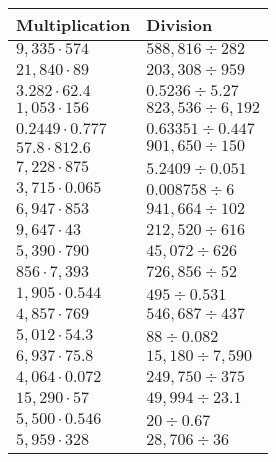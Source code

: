 \begin{longtable}[]{@{}ll@{}}
\toprule
Multiplication & Division\tabularnewline
\midrule
\endhead
\(9,335\cdot574\) & \(588,816÷282\)\tabularnewline
\(21,840\cdot89\) & \(203,308÷959\)\tabularnewline
\(3.282\cdot62.4\) & \(0.5236÷5.27\)\tabularnewline
\(1,053\cdot156\) & \(823,536÷6,192\)\tabularnewline
\(0.2449\cdot0.777\) & \(0.63351÷0.447\)\tabularnewline
\(57.8\cdot812.6\) & \(901,650÷150\)\tabularnewline
\(7,228\cdot875\) & \(5.2409÷0.051\)\tabularnewline
\(3,715\cdot0.065\) & \(0.008758÷6\)\tabularnewline
\(6,947\cdot853\) & \(941,664÷102\)\tabularnewline
\(9,647\cdot43\) & \(212,520÷616\)\tabularnewline
\(5,390\cdot790\) & \(45,072÷626\)\tabularnewline
\(856\cdot7,393\) & \(726,856÷52\)\tabularnewline
\(1,905\cdot0.544\) & \(495÷0.531\)\tabularnewline
\(4,857\cdot769\) & \(546,687÷437\)\tabularnewline
\(5,012\cdot54.3\) & \(88÷0.082\)\tabularnewline
\(6,937\cdot75.8\) & \(15,180÷7,590\)\tabularnewline
\(4,064\cdot0.072\) & \(249,750÷375\)\tabularnewline
\(15,290\cdot57\) & \(49,994÷23.1\)\tabularnewline
\(5,500\cdot0.546\) & \(20÷0.67\)\tabularnewline
\(5,959\cdot328\) & \(28,706÷36\)\tabularnewline
\bottomrule
\end{longtable}
